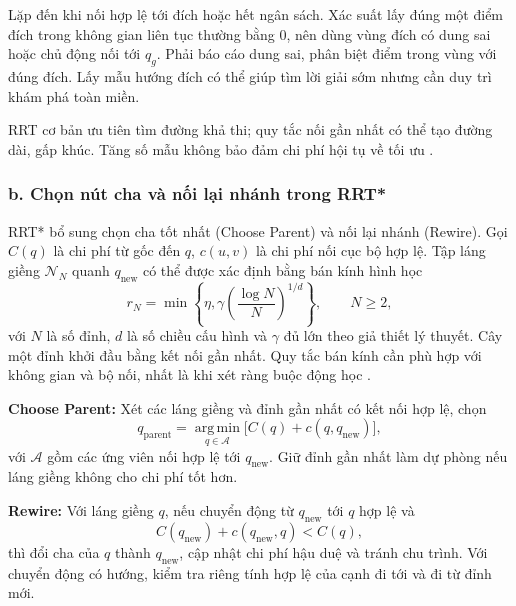 \documentclass[12pt,a4paper,oneside]{report}
\begin{document}
Lặp đến khi nối hợp lệ tới đích hoặc hết ngân sách. Xác suất lấy đúng một điểm đích trong không gian liên tục thường bằng \(0\), nên dùng vùng đích có dung sai hoặc chủ động nối tới \(q_g\). Phải báo cáo dung sai, phân biệt điểm trong vùng với đúng đích. Lấy mẫu hướng đích có thể giúp tìm lời giải sớm nhưng cần duy trì khám phá toàn miền.

RRT cơ bản ưu tiên tìm đường khả thi; quy tắc nối gần nhất có thể tạo đường dài, gấp khúc. Tăng số mẫu không bảo đảm chi phí hội tụ về tối ưu \cite{karaman-frazzoli-2011}.

\subsubsection*{b. Chọn nút cha và nối lại nhánh trong RRT*}

RRT* bổ sung chọn cha tốt nhất (Choose Parent) và nối lại nhánh (Rewire). Gọi \(C(q)\) là chi phí từ gốc đến \(q\), \(c(u,v)\) là chi phí nối cục bộ hợp lệ. Tập láng giềng \(\mathcal{N}_N\) quanh \(q_{\mathrm{new}}\) có thể được xác định bằng bán kính hình học
\begin{equation}
  r_N=\min\!\left\{\eta,\gamma\left(\frac{\log N}{N}\right)^{1/d}\right\},
  \qquad N\geq2,
  \label{eq:rrtstar-radius}
\end{equation}
với \(N\) là số đỉnh, \(d\) là số chiều cấu hình và \(\gamma\) đủ lớn theo giả thiết lý thuyết. Cây một đỉnh khởi đầu bằng kết nối gần nhất. Quy tắc bán kính cần phù hợp với không gian và bộ nối, nhất là khi xét ràng buộc động học \cite{karaman-frazzoli-2011}.

\textbf{Choose Parent:} Xét các láng giềng và đỉnh gần nhất có kết nối hợp lệ, chọn
\begin{equation}
  q_{\mathrm{parent}}=
    \operatorname*{arg\,min}_{q\in\mathcal{A}}
    \bigl[C(q)+c(q,q_{\mathrm{new}})\bigr],
  \label{eq:rrtstar-parent}
\end{equation}
với \(\mathcal{A}\) gồm các ứng viên nối hợp lệ tới \(q_{\mathrm{new}}\). Giữ đỉnh gần nhất làm dự phòng nếu láng giềng không cho chi phí tốt hơn.

\textbf{Rewire:} Với láng giềng \(q\), nếu chuyển động từ \(q_{\mathrm{new}}\) tới \(q\) hợp lệ và
\begin{equation}
  C(q_{\mathrm{new}})+c(q_{\mathrm{new}},q)<C(q),
  \label{eq:rrtstar-rewire}
\end{equation}
thì đổi cha của \(q\) thành \(q_{\mathrm{new}}\), cập nhật chi phí hậu duệ và tránh chu trình. Với chuyển động có hướng, kiểm tra riêng tính hợp lệ của cạnh đi tới và đi từ đỉnh mới.
\end{document}
